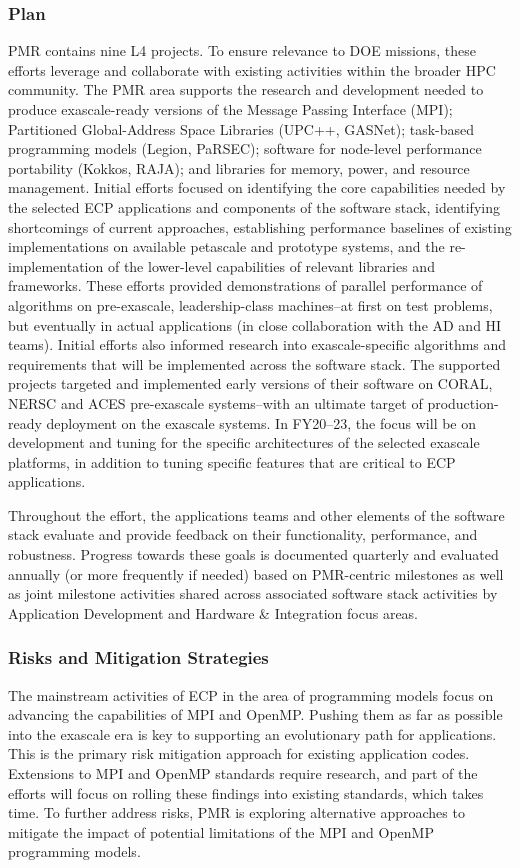 \subsubsection{Plan}
PMR contains nine L4 projects. To ensure relevance to DOE missions, these efforts leverage and collaborate with existing activities within the broader HPC community. The PMR area supports the research and development needed to produce exascale-ready versions of the Message Passing Interface (MPI);  Partitioned Global-Address Space Libraries (UPC++, GASNet); task-based programming models (Legion, PaRSEC); software for node-level performance portability (Kokkos, RAJA); and libraries for memory, power, and resource management.
Initial efforts focused on identifying the core capabilities needed by the selected ECP applications and components of the software stack, identifying shortcomings of current approaches, establishing performance baselines of existing implementations on available petascale and prototype systems, and the re-implementation of the lower-level capabilities of relevant libraries and frameworks. These efforts provided demonstrations of parallel performance of algorithms on pre-exascale, leadership-class machines--at first on test problems, but eventually in actual applications (in close collaboration with the AD and HI teams). Initial efforts also informed research into exascale-specific algorithms and requirements that will be implemented across the software stack. The supported projects targeted and implemented early versions of their software on CORAL, NERSC and ACES pre-exascale systems--with an ultimate target of production-ready deployment on the exascale systems.
In FY20--23, the focus will be on development and tuning for the specific architectures of the selected exascale platforms, in addition to tuning specific features that are critical to ECP applications.

Throughout the effort, the applications teams and other elements of the software stack evaluate and provide feedback on their functionality, performance, and robustness. Progress towards these goals is documented quarterly and evaluated annually (or more frequently if needed) based on PMR-centric milestones as well as joint milestone activities shared across associated software stack activities by Application Development and Hardware \& Integration focus areas.


\subsubsection{Risks and Mitigation Strategies}
The mainstream activities of ECP in the area of programming models focus on advancing the capabilities of MPI and OpenMP. Pushing them as far as possible into the exascale era is key to supporting an evolutionary path for applications. This is the primary risk mitigation approach for existing application codes. Extensions to MPI and OpenMP standards require research, and part of the efforts will focus on rolling these findings into existing standards, which takes time. To further address risks, PMR is exploring alternative approaches to mitigate the impact of potential limitations of the MPI and OpenMP programming models. 

